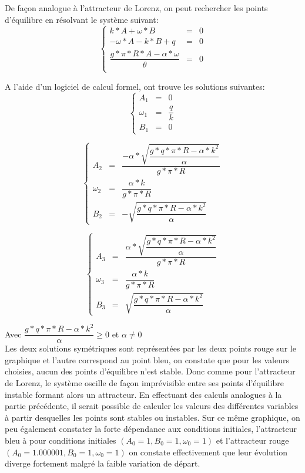 De façon analogue à l'attracteur de Lorenz, on peut rechercher les points d'équilibre en résolvant le système suivant:
\[
    \left\{
    \begin{array}{rcl}
        k*A+\omega*B&=&0\\
        -\omega*A-k*B+q&=&0\\
        \dfrac{g*\pi*R*A-\alpha*\omega}{\theta }&=&0\\
    \end{array}
    \right.
\]

A l'aide d'un logiciel de calcul formel, ont trouve les solutions suivantes:
\[
    \left\{
    \begin{array}{rcl}
        A_1&=&0\\
        \omega_1&=&\dfrac{q}{k}\\
        B_1&=&0

    \end{array}
    \right.
\]

\[
    \left\{
    \begin{array}{rcl}
        A_2&=&\dfrac{-\alpha*\sqrt{\dfrac{g*q*\pi*R-\alpha*k^2}{\alpha}}}{g*\pi*R}\\
        \omega_2&=&\dfrac{\alpha*k}{g*\pi*R}\\
        B_2&=&-\sqrt{\dfrac{g*q*\pi*R-\alpha*k^2}{\alpha}}

    \end{array}
    \right.
\]

\[
    \left\{
    \begin{array}{rcl}
        A_3&=&\dfrac{\alpha*\sqrt{\dfrac{g*q*\pi*R-\alpha*k^2}{\alpha}}}{g*\pi*R}\\
        \omega_3&=&\dfrac{\alpha*k}{g*\pi*R}\\
        B_3&=&\sqrt{\dfrac{g*q*\pi*R-\alpha*k^2}{\alpha}}

    \end{array}
    \right.
\]

Avec $\dfrac{g*q*\pi*R-\alpha*k^2}{\alpha} \geq 0$ et $\alpha\neq 0$\\

Les deux solutions symétriques sont représentées par les deux points rouge sur le graphique et l'autre correspond au point bleu, on constate que pour les valeurs choisies, aucun des points d'équilibre n'est stable. Donc comme pour l'attracteur de Lorenz, le système oscille de façon imprévisible entre ses points d'équilibre instable formant alors un attracteur. En effectuant des calculs analogues à la partie précédente, il serait possible de calculer les valeurs des différentes variables à partir desquelles les points sont stables ou instables. 
Sur ce même graphique, on peu également constater la forte dépendance aux conditions initiales, l'attracteur bleu à pour conditions initiales $(A_0=1,B_0=1,\omega_0=1)$ et l'attracteur rouge $(A_0=1.000001,B_0=1,\omega_0=1)$ on constate effectivement que leur évolution diverge fortement malgré la faible variation de départ.



